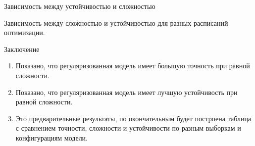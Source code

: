 \documentclass[9pt,pdf,hyperref={unicode}]{beamer}
\begin{document}
\begin{frame}{Зависимость между устойчивостью и сложностью}
\begin{center}
\begin{figure}[h!]
\label{fig:opt schedule 2}
\end{figure}
Зависимость между сложностью и устойчивостью для разных расписаний оптимизации.
\end{center}
\end{frame}

\begin{frame}{Заключение}

    \begin{enumerate}
           \item 
        Показано, что регуляризованная модель имеет большую точность при равной сложности.
        \item 
        Показано, что регуляризованная модель имеет лучшую устойчивость при равной сложности.
        \item 
        Это предварительные результаты, по окончательным будет построена таблица с сравнением точности, сложности и устойчивости по разным выборкам и конфигурациям модели.
    \end{enumerate}
			
			
			
			
			

\end{frame}
\end{document}
